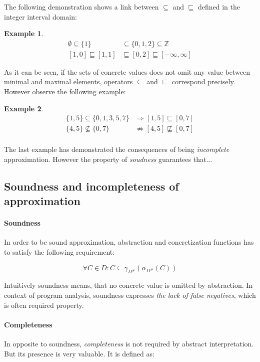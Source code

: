 \documentclass[12pt,oneside]{fithesis2}
\theoremstyle{definition}
\newtheorem{exmp}{Example}[section]
\begin{document}
The following demonstration shows a link between $\subseteq$ and $\sqsubseteq$ defined in the integer interval domain:

\begin{exmp}
  \begin{align*}
    \emptyset \subseteq \{1\} &\subseteq \{0, 1, 2\} \subseteq \mathbb Z\\
    [1,0] \sqsubseteq [1,1] &\sqsubseteq [0,2] \sqsubseteq [-\infty,\infty]
  \end{align*}
\end{exmp}

As it can be seen, if the sets of concrete values does not omit any value between minimal and maximal elements, operators $\subseteq$ and $\sqsubseteq$ correspond precisely. However observe the following example:

\begin{exmp}
  \begin{align*}
    \{1, 5\} \subseteq \{0, 1, 3, 5, 7\} &\Rightarrow [1,5] \sqsubseteq [0,7]\\
    \{ 4, 5\} \not\subseteq \{0, 7\} &\not\Rightarrow [4,5] \not\sqsubseteq [0,7]\\
  \end{align*}
\end{exmp}

The last example has demonstrated the consequences of being \textit{incomplete} approximation. However the property of \textit{soudness} guarantees that... %

\subsection{Soundness and incompleteness of approximation}\label{ssec:soundness-incompleteness}

\paragraph{Soundness}
In order to be sound approximation, abstraction and concretization functions has to satisfy the following requirement: \cite{mine-AIAA10}

\[
  \forall C \in D: C \subseteq \gamma_{D^\#}(\alpha_{D^\#}(C))
\]

Intuitively soundness means, that no concrete value is omitted by abstraction. In context of program analysis, soundness expresses \textit{the lack of false negatives}, which is often required property.

\paragraph{Completeness}
In opposite to soundness, \textit{completeness} is not required by abstract interpretation. But its presence is very valuable. It is defined as: \cite{mine-AIAA10}
\end{document}

